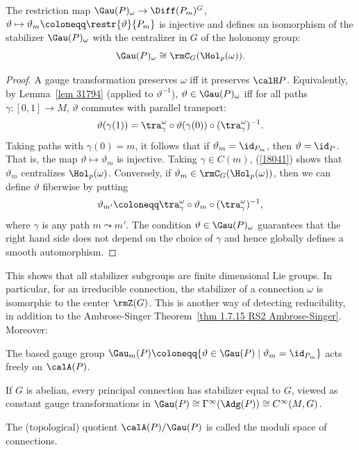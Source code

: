 \begin{prop}
    The restriction map $\Gau(P)_\omega\to \Diff(P_m)^G$, $\vartheta\mapsto \vartheta_m\coloneqq\restr{\vartheta}{P_m}$ is injective and defines an isomorphism of the stabilizer $\Gau(P)_\omega$ with the centralizer in $G$ of the holonomy group:
    \[\Gau(P)_\omega\cong \rmC_G(\Hol_p(\omega)).\]
\end{prop}
\begin{proof}
    A gauge transformation preserves $\omega$ iff it preserves $\calH P$. Equivalently, by Lemma~\ref{lem 31794} (applied to $\vartheta^{-1}$), $\vartheta\in\Gau(P)_\omega$ iff for all paths $\gamma:[0,1]\to M$, $\vartheta$ commutes with parallel transport:
    \[\vartheta(\gamma(1))=\tra_\gamma^\omega\circ \vartheta(\gamma(0))\circ(\tra_\gamma^\omega)^{-1}.\label{18041}\]
    Taking paths with $\gamma(0)=m$, it follows that if $\vartheta_m=\id_{P_m}$, then $\vartheta=\id_P$. That is, the map $\vartheta\mapsto\vartheta_m$ is injective. Taking $\gamma\in C(m)$, (\ref{18041}) shows that $\vartheta_m$ centralizes $\Hol_p(\omega)$. Conversely, if $\vartheta_m\in \rmC_G(\Hol_p(\omega))$, then we can define $\vartheta$ fiberwise by putting
    \[\vartheta_{m'}\coloneqq \tra_\gamma^\omega\circ \vartheta_m\circ (\tra_\gamma^\omega)^{-1},\]
    where $\gamma$ is any path $m\leadsto m'$. The condition $\vartheta\in \Gau(P)_\omega$ guarantees that the right hand side does not depend on the choice of $\gamma$ and hence globally defines a smooth automorphism.
\end{proof}

This shows that all stabilizer subgroups are finite dimensional Lie groups. In particular, for an irreducible connection, the stabilizer of a connection $\omega$ is isomorphic to the center $\rmZ(G)$. This is another way of detecting reducibility, in addition to the Ambrose-Singer Theorem~\ref{thm 1.7.15 RS2 Ambrose-Singer}. Moreover:

\begin{cor}
    The based gauge group $\Gau_m(P)\coloneqq \{\vartheta\in \Gau(P)\mid \vartheta_m=\id_{P_m}\}$ acts freely on $\calA(P)$.
\end{cor}
\begin{cor}
    If $G$ is abelian, every principal connection has stabilizer equal to $G$, viewed as constant gauge transformations in $\Gau(P)\cong \Gamma^\infty(\Adg(P))\cong C^\infty(M,G)$.
\end{cor}

\begin{defn}
    The (topological) quotient $\calA(P)\slash \Gau(P)$ is called the moduli space of connections. 
\end{defn}

